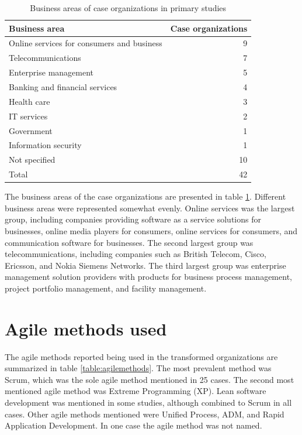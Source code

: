 \begin{table}[!t]
    \centering
    \begin{tabular}{ l r }
        \toprule
        Business area    &  Case organizations   \\
        \midrule
		Online services for consumers and business  &  9  \\
		Telecommunications                          &  7  \\
		Enterprise management                       &  5  \\
		Banking and financial services              &  4  \\
		Health care                                  &  3  \\
		IT services                                 &  2  \\
		Government                                  &  1  \\
		Information security                        &  1  \\
		Not specified                               & 10  \\
        \midrule
		Total                                       & 42  \\
        \bottomrule
    \end{tabular}
    \caption{Business areas of case organizations in primary studies}
    \label{table:businessareas}
\end{table}

The business areas of the case organizations are presented in table
\ref{table:businessareas}. Different business areas were represented somewhat
evenly. Online services was the largest group, including companies
providing software as a service solutions for businesses, online media players
for consumers, online services for consumers, and communication software for
businesses. The second largest group was telecommunications, including companies
such as British Telecom, Cisco, Ericsson, and Nokia Siemens Networks. The third
largest group was enterprise management solution providers with products for
business process management, project portfolio management, and facility
management.


\section{Agile methods used}

The agile methods reported being used in the transformed organizations are
summarized in table \ref{table:agilemethods}. The most prevalent method was
Scrum, which was the sole agile method mentioned in 25 cases. The second most
mentioned agile method was Extreme Programming (XP). Lean software development
was mentioned in some studies, although combined to Scrum in all cases. Other
agile methods mentioned were Unified Process, ADM, and Rapid Application
Development. In one case the agile method was not named.

